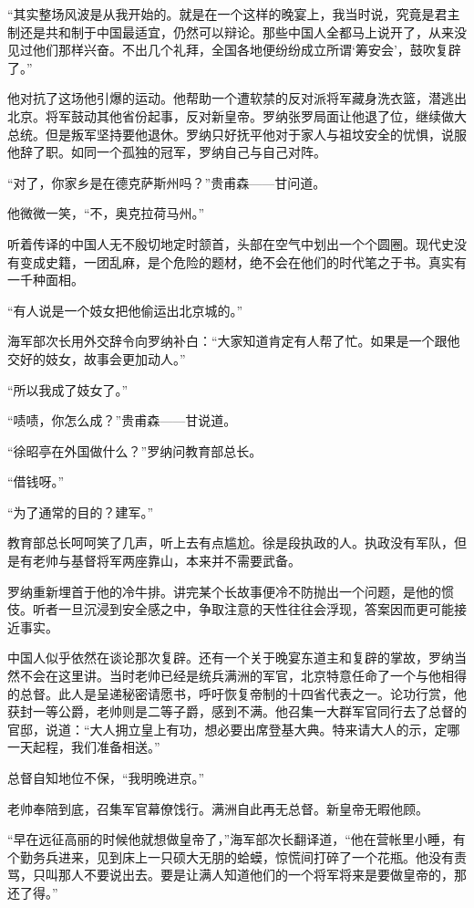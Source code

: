 \par “其实整场风波是从我开始的。就是在一个这样的晚宴上，我当时说，究竟是君主制还是共和制于中国最适宜，仍然可以辩论。那些中国人全都马上说开了，从来没见过他们那样兴奋。不出几个礼拜，全国各地便纷纷成立所谓‘筹安会’，鼓吹复辟了。”
\par 他对抗了这场他引爆的运动。他帮助一个遭软禁的反对派将军藏身洗衣篮，潜逃出北京。将军鼓动其他省份起事，反对新皇帝。罗纳张罗局面让他退了位，继续做大总统。但是叛军坚持要他退休。罗纳只好抚平他对于家人与祖坟安全的忧惧，说服他辞了职。如同一个孤独的冠军，罗纳自己与自己对阵。
\par “对了，你家乡是在德克萨斯州吗？”贵甫森——甘问道。
\par 他微微一笑，“不，奥克拉荷马州。”
\par 听着传译的中国人无不殷切地定时颔首，头部在空气中划出一个个圆圈。现代史没有变成史籍，一团乱麻，是个危险的题材，绝不会在他们的时代笔之于书。真实有一千种面相。
\par “有人说是一个妓女把他偷运出北京城的。”
\par 海军部次长用外交辞令向罗纳补白：“大家知道肯定有人帮了忙。如果是一个跟他交好的妓女，故事会更加动人。”
\par “所以我成了妓女了。”
\par “啧啧，你怎么成？”贵甫森——甘说道。
\par “徐昭亭在外国做什么？”罗纳问教育部总长。
\par “借钱呀。”
\par “为了通常的目的？建军。”
\par 教育部总长呵呵笑了几声，听上去有点尴尬。徐是段执政的人。执政没有军队，但是有老帅与基督将军两座靠山，本来并不需要武备。
\par 罗纳重新埋首于他的冷牛排。讲完某个长故事便冷不防抛出一个问题，是他的惯伎。听者一旦沉浸到安全感之中，争取注意的天性往往会浮现，答案因而更可能接近事实。
\par 中国人似乎依然在谈论那次复辟。还有一个关于晚宴东道主和复辟的掌故，罗纳当然不会在这里讲。当时老帅已经是统兵满洲的军官，北京特意任命了一个与他相得的总督。此人是呈递秘密请愿书，呼吁恢复帝制的十四省代表之一。论功行赏，他获封一等公爵，老帅则是二等子爵，感到不满。他召集一大群军官同行去了总督的官邸，说道：“大人拥立皇上有功，想必要出席登基大典。特来请大人的示，定哪一天起程，我们准备相送。”
\par 总督自知地位不保，“我明晚进京。”
\par 老帅奉陪到底，召集军官幕僚饯行。满洲自此再无总督。新皇帝无暇他顾。
\par “早在远征高丽的时候他就想做皇帝了，”海军部次长翻译道，“他在营帐里小睡，有个勤务兵进来，见到床上一只硕大无朋的蛤蟆，惊慌间打碎了一个花瓶。他没有责骂，只叫那人不要说出去。要是让满人知道他们的一个将军将来是要做皇帝的，那还了得。”
